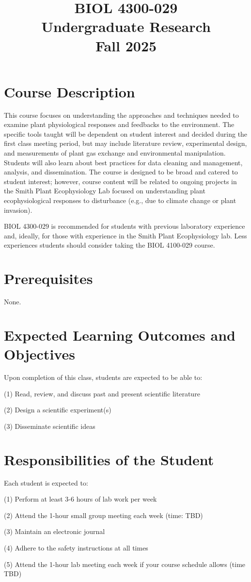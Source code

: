 \documentclass[12pt, notitlepage]{article}   	%
\title{
	\textbf{
		BIOL 4300-029
	} \\
	\large Undergraduate Research \\
	\large Fall 2025
}
\date{\vspace{-5ex}}
\begin{document}
{\selectfont %

\maketitle

\section{Course Description}
This course focuses on understanding the approaches and techniques needed to examine plant physiological responses and feedbacks to the environment. The specific tools taught will be dependent on student interest and decided during the first class meeting period, but may include literature review, experimental design, and measurements of plant gas exchange and environmental manipulation. Students will also learn about best practices for data cleaning and management, analysis, and dissemination. The course is designed to be broad and catered to student interest; however, course content will be related to ongoing projects in the Smith Plant Ecophysiology Lab focused on understanding plant ecophysiological responses to disturbance (e.g., due to climate change or plant invasion). 

BIOL 4300-029 is recommended for students with previous laboratory experience and, ideally, for those with experience in the Smith Plant Ecophysiology lab. Less experiences students should consider taking the BIOL 4100-029 course.

\section{Prerequisites}
None.

\section{Expected Learning Outcomes and Objectives}
Upon completion of this class, students are expected to be able to:\par
(1)	Read, review, and discuss past and present scientific literature\par
(2) Design a scientific experiment(s)\par
(3) Disseminate scientific ideas\par

\section{Responsibilities of the Student}
Each student is expected to:\par
(1) Perform at least 3-6 hours of lab work per week\par
(2) Attend the 1-hour small group meeting each week (time: TBD)\par
(3) Maintain an electronic journal\par
(4) Adhere to the safety instructions at all times\par
(5) Attend the 1-hour lab meeting each week if your course schedule allows (time TBD)\par

}
\end{document}
